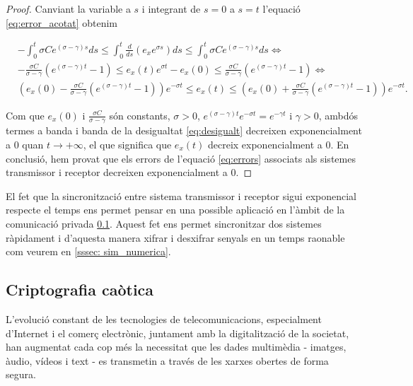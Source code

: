\documentclass[11pt,a4paper,openright,oneside]{article}
\numberwithin{equation}{section}
\theoremstyle{definition}
\begin{document}
\begin{proof}
    Canviant la variable a $s$ i integrant de $s = 0$ a $s = t$  l'equació \eqref{eq:error_acotat} obtenim

    \begin{equation}\begin{aligned}\label{eq:desigualt}
        &-\int_{0}^{t} \sigma Ce^{(\sigma - \gamma)s}ds \le \int_{0}^{t} \frac{d}{ds}(e_xe^{\sigma s})ds \le \int_{0}^{t} \sigma Ce^{(\sigma - \gamma)s}ds \iff \\ 
        &-\frac{\sigma C}{\sigma - \gamma}\left(e^{(\sigma - \gamma)t}-1\right) \le e_x(t)e^{\sigma t}-e_x(0) \le \frac{\sigma C}{\sigma - \gamma}\left(e^{(\sigma - \gamma)t}-1\right) \iff \\
        &\left(e_x(0)-\frac{\sigma C}{\sigma - \gamma}\left(e^{(\sigma - \gamma)t}-1\right)\right)e^{-\sigma t} \le e_x(t) \le \left(e_x(0)+\frac{\sigma C}{\sigma - \gamma}\left(e^{(\sigma - \gamma)t}-1\right)\right)e^{-\sigma t}.
    \end{aligned}\end{equation}

    Com que $e_x(0)$ i $\frac{\sigma C}{\sigma - \gamma}$ són constants, $\sigma>0$, $e^{(\sigma - \gamma)t}e^{-\sigma t}=e^{-\gamma t}$ i $\gamma > 0$, ambdós termes a banda i banda de la desigualtat \eqref{eq:desigualt} decreixen exponencialment a $0$ quan $t\rightarrow{+\infty}$, el que significa que $e_x(t)$ decreix exponencialment a 0. En conclusió, hem provat que els errors de l'equació \eqref{eq:errors} associats als sistemes transmissor i receptor decreixen exponencialment a $0$.
\end{proof}

El fet que la sincronització entre sistema transmissor i receptor sigui exponencial respecte el temps ens permet pensar en una possible aplicació en l'àmbit de la comunicació privada \ref{sssec:cripto_caotica}. Aquest fet ens permet sincronitzar dos sistemes ràpidament i d'aquesta manera xifrar i desxifrar senyals en un temps raonable com veurem en \ref{sssec: sim_numerica}. 

\subsection{Criptografia caòtica} \label{sssec:cripto_caotica}

L'evolució constant de les tecnologies de telecomunicacions, especialment d'Internet i el comerç electrònic, juntament amb la digitalització de la societat, han augmentat cada cop més la necessitat que les dades multimèdia - imatges, àudio, vídeos i text - es transmetin a través de les xarxes obertes de forma segura.
\end{document}
